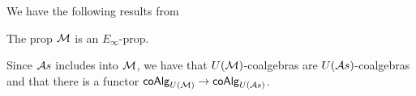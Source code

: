We have the following results from \cite{Medina20prop1}

\begin{proposition}
	The prop $\mathcal{M}$ is an $E_\infty$-prop.
\end{proposition}

Since $\mathcal{A}s$ includes into $\mathcal{M}$, we have that $U(\mathcal{M})$-coalgebras are $U(\mathcal{A}s)$-coalgebras and that there is a functor $\mathsf{coAlg}_{U(\mathcal{M})} \to \mathsf{coAlg}_{U(\mathcal{A}s)}$.
